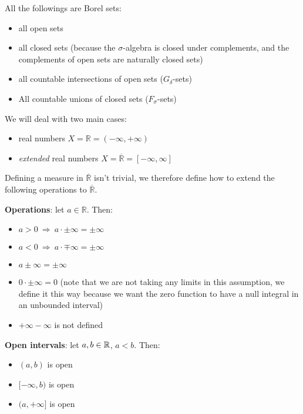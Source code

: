 All the followings are Borel sets:
\begin{itemize}
    \item all open sets
    \item all closed sets (because the $\sigma$-algebra is closed under complements, and the complements of open sets are naturally closed sets)
    \item all countable intersections of open sets ($G_\delta$-sets)  
    \item All countable unions of closed sets ($F_\sigma$-sets)  
\end{itemize}

We will deal with two main cases:
\begin{itemize}
    \item real numbers $X=\mathbb{R}=(-\infty,+\infty)$
    \item \textit{extended} real numbers $X=\overline{\mathbb{R}} = [-\infty,\infty]$ 
\end{itemize}

\begin{subtle}
Defining a measure in $\overline{\mathbb{R}}$ isn't trivial, we therefore define how to extend the following operations to $\overline{\mathbb{R}}$.

\textbf{Operations}: let $a\in \mathbb{R}$. Then:
\begin{itemize}
    \item $a>0\ \Longrightarrow\ a\cdot \pm \infty = \pm \infty$
    \item $a<0\ \Longrightarrow\ a\cdot \mp \infty = \pm \infty$
    \item $a\pm \infty = \pm \infty$
    \item $0\cdot \pm \infty = 0$ (note that we are not taking any limits in this assumption, we define it this way because we want the zero function to have a null integral in an unbounded interval)
    \item $+\infty -\infty$ is not defined
\end{itemize}

\textbf{Open intervals}: let $a,b\in\mathbb{R}$, $a<b$. Then:
\begin{itemize}
    \item $(a,b)$ is open
    \item $[-\infty , b)$ is open
    \item $(a,+\infty ]$ is open
\end{itemize}
\end{subtle}

\newpage

